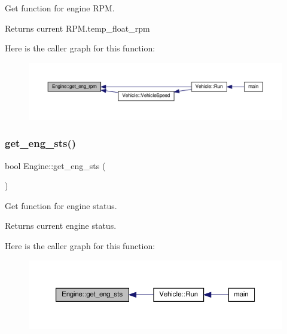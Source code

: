 Get function for engine R\+PM. \begin{DoxyReturn}{Returns}
current R\+P\+M.\+temp\+\_\+float\+\_\+rpm 
\end{DoxyReturn}
Here is the caller graph for this function\+:
\nopagebreak
\begin{figure}[H]
\begin{center}
\leavevmode
\includegraphics[width=350pt]{classEngine_a31646756334221f7967a114c64f188f4_icgraph}
\end{center}
\end{figure}
\mbox{\label{classEngine_abf40022906338faef233d44a93ea01af}} 
\subsubsection{\texorpdfstring{get\+\_\+eng\+\_\+sts()}{get\_eng\_sts()}}
{\footnotesize\ttfamily bool Engine\+::get\+\_\+eng\+\_\+sts (\begin{DoxyParamCaption}{ }\end{DoxyParamCaption})}

Get function for engine status. \begin{DoxyReturn}{Returns}
current engine status. 
\end{DoxyReturn}
Here is the caller graph for this function\+:
\nopagebreak
\begin{figure}[H]
\begin{center}
\leavevmode
\includegraphics[width=350pt]{classEngine_abf40022906338faef233d44a93ea01af_icgraph}
\end{center}
\end{figure}
\mbox{\label{classEngine_a7e4b7cfcb9184beb80fed0ea60a3aad1}} 
